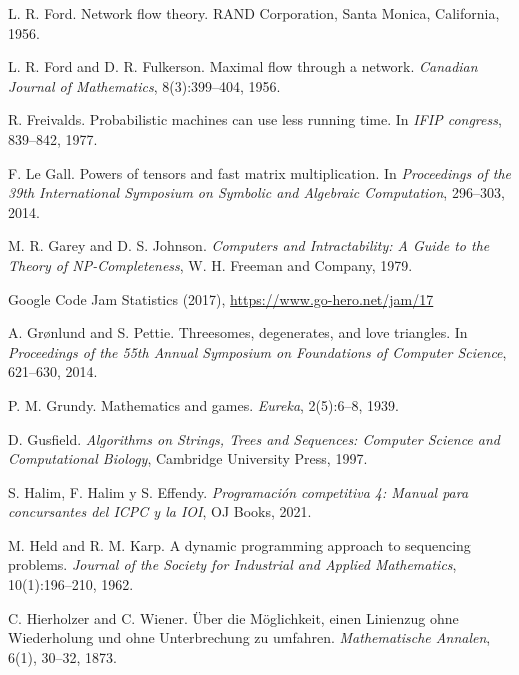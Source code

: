 \begin{thebibliography}{9}
    L. R. Ford.
    Network flow theory.
    RAND Corporation, Santa Monica, California, 1956.

    L. R. Ford and D. R. Fulkerson.
    Maximal flow through a network.
    \emph{Canadian Journal of Mathematics}, 8(3):399--404, 1956.

    R. Freivalds.
    Probabilistic machines can use less running time.
    In \emph{IFIP congress}, 839--842, 1977.

    F. Le Gall.
    Powers of tensors and fast matrix multiplication.
    In \emph{Proceedings of the 39th International Symposium on Symbolic and Algebraic Computation},
    296--303, 2014.

    M. R. Garey and D. S. Johnson.
    \emph{Computers and Intractability:
        A Guide to the Theory of NP-Completeness},
    W. H. Freeman and Company, 1979.

    Google Code Jam Statistics (2017),
    \url{https://www.go-hero.net/jam/17}

    A. Grønlund and S. Pettie.
    Threesomes, degenerates, and love triangles.
    In \emph{Proceedings of the 55th Annual Symposium on Foundations of Computer Science},
    621--630, 2014.

    P. M. Grundy.
    Mathematics and games.
    \emph{Eureka}, 2(5):6--8, 1939.

    D. Gusfield.
    \emph{Algorithms on Strings, Trees and Sequences:
        Computer Science and Computational Biology},
    Cambridge University Press, 1997.


    S. Halim, F. Halim y S. Effendy.
    \emph{Programación competitiva 4: Manual para concursantes del ICPC y la IOI}, OJ Books, 2021.

    M. Held and R. M. Karp.
    A dynamic programming approach to sequencing problems.
    \emph{Journal of the Society for Industrial and Applied Mathematics}, 10(1):196--210, 1962.

    C. Hierholzer and C. Wiener.
    Über die Möglichkeit, einen Linienzug ohne Wiederholung und ohne Unterbrechung zu umfahren.
    \emph{Mathematische Annalen}, 6(1), 30--32, 1873.


\end{thebibliography}

